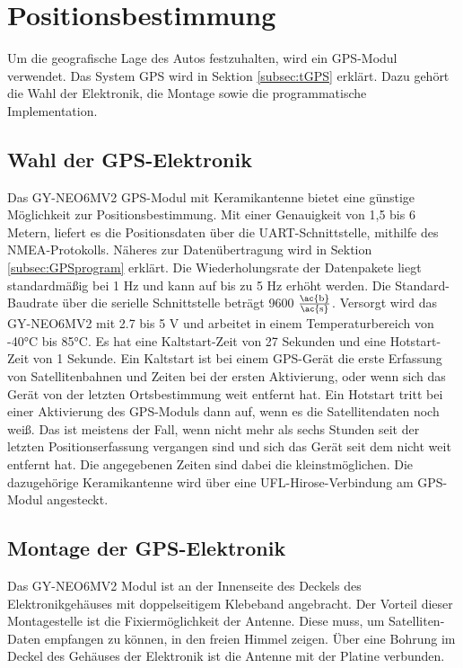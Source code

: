 \section{Positionsbestimmung}
\label{sec:GPS}
Um die geografische Lage des Autos festzuhalten, wird ein \ac{GPS}-Modul verwendet. Das System \ac{GPS} wird in Sektion \ref{subsec:tGPS} erklärt. Dazu gehört die Wahl der Elektronik, die Montage sowie die programmatische Implementation.

\subsection{Wahl der GPS-Elektronik}
\label{subsec:GPSchoice}
Das GY-NEO6MV2 \ac{GPS}-Modul mit Keramikantenne bietet eine günstige Möglichkeit zur Positionsbestimmung. Mit einer Genauigkeit von 1,5 bis 6 Metern, liefert es die Positionsdaten über die \ac{UART}-Schnittstelle, mithilfe des \ac{NMEA}-Protokolls. Näheres zur Datenübertragung wird in Sektion \ref{subsec:GPSprogram} erklärt. Die Wiederholungsrate der Datenpakete liegt standardmäßig bei 1 \ac{Hz} und kann auf bis zu 5 \ac{Hz} erhöht werden. Die Standard-Baudrate über die serielle Schnittstelle beträgt 9600 $\frac{\mathrm{\ac{b}}}{\mathrm{\ac{s}}}$. Versorgt wird das GY-NEO6MV2 mit 2.7 bis 5 V und arbeitet in einem Temperaturbereich von -40°C bis 85°C. Es hat eine Kaltstart-Zeit von 27 Sekunden und eine Hotstart-Zeit von 1 Sekunde. Ein Kaltstart ist bei einem GPS-Gerät die erste Erfassung von Satellitenbahnen und Zeiten bei der ersten Aktivierung, oder wenn sich das Gerät von der letzten Ortsbestimmung weit entfernt hat. Ein Hotstart tritt bei einer Aktivierung des GPS-Moduls dann auf, wenn es die Satellitendaten noch weiß. Das ist meistens der Fall, wenn nicht mehr als sechs Stunden seit der letzten Positionserfassung vergangen sind und sich das Gerät seit dem nicht weit entfernt hat. Die angegebenen Zeiten sind dabei die kleinstmöglichen. Die dazugehörige Keramikantenne wird über eine UFL-Hirose-Verbindung am GPS-Modul angesteckt. 

\subsection{Montage der GPS-Elektronik}
\label{subsec:GPSmount}
Das GY-NEO6MV2 Modul ist an der Innenseite des Deckels des Elektronikgehäuses mit doppelseitigem Klebeband angebracht. Der Vorteil dieser Montagestelle ist die Fixiermöglichkeit der Antenne. Diese muss, um Satelliten-Daten empfangen zu können, in den freien Himmel zeigen. Über eine Bohrung im Deckel des Gehäuses der Elektronik ist die Antenne mit der Platine verbunden.

